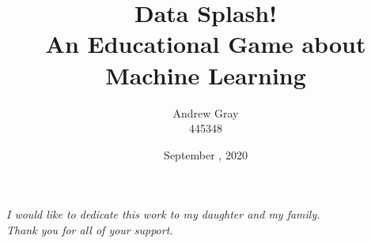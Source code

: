 \documentclass[10pt, a4paper, twoside, openright]{custard}
\begin{document}
	
	\title{Data Splash! \protect\\An Educational Game about Machine Learning}
	\author{Andrew Gray\protect\\{\normalsize 445348}}
	
	
	\date{September , 2020}
	
	
	
	\frontmatter%
	\maketitle
	\declaration
	\cleardoublepage
	
	\begin{vplace}[0.7]
		\begin{large}
			\begin{center}
				\textit{I would like to dedicate this work to my daughter and my family.\\Thank you for all of your support.}
			\end{center}
		\end{large}
	\end{vplace}
\end{document}
